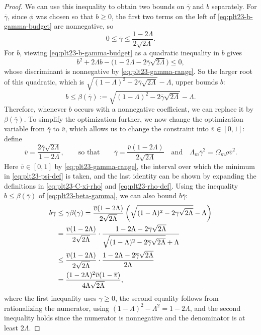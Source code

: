 ﻿\documentclass[11pt]{article}
\numberwithin{equation}{section}
\begin{document}
\begin{proof}
  We can use this inequality to obtain two bounds on $\overline\gamma$ and $b$ separately.
  For $\overline\gamma$, since $\phi$ was chosen so that $b\ge0$, the first two terms on the left of \eqref{eq:plt23-b-gamma-budget} are nonnegative, so
  \begin{equation}\label{eq:plt23-gamma-range}
    0\le\overline\gamma\le\frac{1-2\Lambda}{2\sqrt{2\Lambda}}.
  \end{equation}
  For $b$, viewing \eqref{eq:plt23-b-gamma-budget} as a quadratic inequality in $b$ gives
  \[
    b^2+2\Lambda b-\bigl(1-2\Lambda-2\overline\gamma\sqrt{2\Lambda}\bigr)\le0,
  \]
  whose discriminant is nonnegative by \eqref{eq:plt23-gamma-range}.
  So the larger root of this quadratic, which is $\sqrt{(1-\Lambda)^2-2\overline\gamma\sqrt{2\Lambda}}-\Lambda$, upper bounds $b$:
  \begin{equation}\label{eq:plt23-beta-gamma}
    b\le\beta(\overline\gamma):=
    \sqrt{(1-\Lambda)^2-2\overline\gamma\sqrt{2\Lambda}}-\Lambda.
  \end{equation}
  Therefore, whenever $b$ occurs with a nonnegative coefficient, we can replace it by $\beta(\overline\gamma)$.
  To simplify the optimization further, we now change the optimization variable from $\overline\gamma$ to $\overline v$, which allows us to change the constraint into $\overline v\in[0,1]$: define
  \begin{equation}\label{eq:plt23-v-def}
    \overline v=\frac{2\overline\gamma\sqrt{2\Lambda}}{1-2\Lambda},
    \qquad\text{so that}\qquad
    \overline\gamma=\frac{\overline v(1-2\Lambda)}{2\sqrt{2\Lambda}}
    \quad\text{and}\quad
    \Lambda_m\overline\gamma^2=\Omega_m\rho\overline v^2.
  \end{equation}
  Here $\overline v \in [0,1]$ by \eqref{eq:plt23-gamma-range}, the interval over which the minimum in \eqref{eq:plt23-psi-def} is taken, and the last identity can be shown by expanding the definitions in \eqref{eq:plt23-C-xi-rho} and \eqref{eq:plt23-rho-def}.
  Using the inequality $b\le\beta(\overline\gamma)$ of \eqref{eq:plt23-beta-gamma}, we can also bound $b\overline\gamma$:
  \begin{align}
    b\overline\gamma
    &\le\overline\gamma\beta(\overline\gamma)
    =\frac{\overline v(1-2\Lambda)}{2\sqrt{2\Lambda}}
      \left(\sqrt{(1-\Lambda)^2-2\overline\gamma\sqrt{2\Lambda}}-\Lambda\right)
    \notag\\
    &=\frac{\overline v(1-2\Lambda)}{2\sqrt{2\Lambda}}
      \cdot\frac{1-2\Lambda-2\overline\gamma\sqrt{2\Lambda}}
      {\sqrt{(1-\Lambda)^2-2\overline\gamma\sqrt{2\Lambda}}+\Lambda}
    \notag\\
    &\le\frac{\overline v(1-2\Lambda)}{2\sqrt{2\Lambda}}
      \cdot\frac{1-2\Lambda-2\overline\gamma\sqrt{2\Lambda}}{2\Lambda}
    \notag\\
    &=\frac{(1-2\Lambda)^2\overline v(1-\overline v)}{4\Lambda\sqrt{2\Lambda}},
    \label{eq:plt23-gamma-beta-v}
  \end{align}
  where the first inequality uses $\overline\gamma\ge0$, the second equality follows from rationalizing the numerator, using $(1-\Lambda)^2-\Lambda^2=1-2\Lambda$, and the second inequality holds since the numerator is nonnegative and the denominator is at least $2\Lambda$.


\end{proof}
\end{document}
